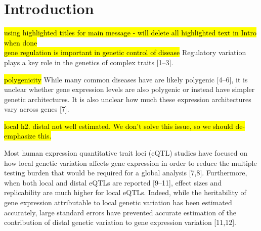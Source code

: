 \documentclass[]{article}
\begin{document}

\section{Introduction}\label{introduction}

\hl{using highlighted titles for main message - will delete all highlighted text in Intro when done}\\

\hl{gene regulation is important in genetic control of disease}
Regulatory variation plays a key role in the genetics of complex traits
{[}1--3{]}. 

\hl{polygenicity} While many common diseases have are likely polygenic
{[}4--6{]}, it is unclear whether gene expression levels are also
polygenic or instead have simpler genetic architectures. It is also
unclear how much these expression architectures vary across genes
{[}7{]}. 

\hl{local h2. distal not well estimated. We don't solve this issue, so we should de-emphasize this.}

Most human expression quantitative trait loci (eQTL) studies
have focused on how local genetic variation affects gene expression in
order to reduce the multiple testing burden that would be required for a
global analysis {[}7,8{]}. Furthermore, when both local and distal eQTLs
are reported {[}9--11{]}, effect sizes and replicability are much higher
for local eQTLs. Indeed, while the heritability of gene expression
attributable to local genetic variation has been estimated accurately,
large standard errors have prevented accurate estimation of the
contribution of distal genetic variation to gene expression variation
{[}11,12{]}.
\end{document}
